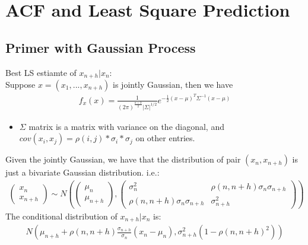 \section{ACF and Least Square Prediction}

\subsection{Primer with Gaussian Process}
Best LS estiamte of $x_{n+h}|x_n$: \\
Suppose $x=(x_1,...,x_{n+h})$ is jointly Gaussian, then we have 
    \begin{align*}
        f_x(x) = \frac{1}{(2\pi)^{\frac{n+h}{2}} |\Sigma|^{1/2}}e^{-\frac{1}{2}(x-\mu)^T\Sigma^{-1}(x-\mu)}
    \end{align*}
    \begin{itemize}
        \item $\Sigma$ matrix is a matrix with variance on the diagonal, and $cov(x_i, x_j)=\rho(i,j)*\sigma_i*\sigma_j$ on other entries.
    \end{itemize}
Given the jointly Gaussian, we have that the distribution of pair $(x_n, x_{n+h})$ is just a bivariate Gaussian distribution. i.e.: 
    \begin{align*}
        \begin{pmatrix}
            x_n \\ x_{n+h}
        \end{pmatrix} \sim 
        N \left ( 
            \begin{pmatrix}
            \mu_n \\ \mu_{n+h}
            \end{pmatrix}
            , 
            \begin{pmatrix}
            \sigma_n^2 & \rho(n, n+h)\sigma_n\sigma_{n+h} \\
            \rho(n, n+h)\sigma_n\sigma_{n+h} & \sigma_{n+h}^2
            \end{pmatrix}            
        \right )
    \end{align*}
The conditional distribution of $x_{n+h}|x_n$ is: 
    \begin{align*}
        N(\mu_{n+h} + \rho(n, n+h) \frac{\sigma_{n+h}}{\sigma_n} (x_n - \mu_n), \sigma_{n+h}^2(1-\rho(n, n+h)^2))
    \end{align*}

